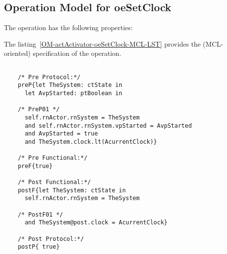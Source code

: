 \subsection{Operation Model for oeSetClock}

\label{OM-oeSetClock}


The  operation has the following properties:

	\begin{operationmodel}



		


	\end{operationmodel}



	\vspace{1cm}
	The listing~\ref{OM-actActivator-oeSetClock-MCL-LST} provides the \msrmessir (MCL-oriented) specification of the operation.
	
	\scriptsize
	\vspace{0.5cm}
	\begin{lstlisting}[style=MessirStyle,firstnumber=auto,captionpos=b,caption={\msrmessir (MCL-oriented) specification of the operation \emph{oeSetClock}.},label=OM-actActivator-oeSetClock-MCL-LST]

	/* Pre Protocol:*/ 
	preP{let TheSystem: ctState in
	  let AvpStarted: ptBoolean in
	  
	/* PreP01 */
	  self.rnActor.rnSystem = TheSystem
	  and self.rnActor.rnSystem.vpStarted = AvpStarted
	  and AvpStarted = true
	  and TheSystem.clock.lt(AcurrentClock)}
	
	/* Pre Functional:*/
	preF{true}
	
	/* Post Functional:*/ 
	postF{let TheSystem: ctState in
	  self.rnActor.rnSystem = TheSystem
	
	/* PostF01 */
	  and TheSystem@post.clock = AcurrentClock}
	
	/* Post Protocol:*/ 
	postP{ true}
	
	\end{lstlisting}
	\normalsize 
	
